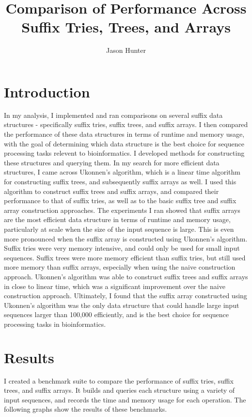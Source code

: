 \documentclass[11pt, letterpaper]{article}
\begin{document}
\title{Comparison of Performance Across Suffix Tries, Trees, and Arrays}
\author{Jason Hunter}
\maketitle

\section{Introduction}
In my analysis, I implemented and ran comparisons on several suffix data structures - 
specifically suffix tries, suffix trees, and suffix arrays. 
I then compared the performance of these data structures in terms of runtime and memory usage, with
the goal of determining which data structure is the best choice for sequence processing tasks relevent to bioinformatics.
I developed methods for constructing these structures and querying them. In my search for more efficient data structures, I came across
Ukonnen's algorithm, which is a linear time algorithm for constructing suffix trees, and subsequently suffix arrays as well.
I used this algorithm to construct suffix trees and suffix arrays, and compared their performance to that of suffix tries,
as well as to the basic suffix tree and suffix array construction approaches. 
The experiments I ran showed that suffix arrays are the most efficient data structure in terms of runtime and memory usage,
particularly at scale when the size of the input sequence is large. This is even more pronounced when the suffix array is constructed using Ukonnen's algorithm.
Suffix tries were very memory intensive, and could only be used for small input sequences. Suffix trees were more memory efficient than suffix tries, but still
used more memory than suffix arrays, especially when using the naive construction approach. Ukonnen's algorithm was able to construct suffix trees and suffix arrays
in close to linear time, which was a significant improvement over the naive construction approach. Ultimately, I found that the suffix array constructed using Ukonnen's algorithm
was the only data structure that could handle large input sequences larger than 100,000 efficiently, and is the best choice for sequence processing tasks in bioinformatics.



\section{Results}
I created a benchmark suite to compare the performance of suffix tries, suffix trees, and suffix arrays.
It builds and queries each structure using a variety of input sequences, and records the time and memory usage for each operation.
The following graphs show the results of these benchmarks.
\end{document}
